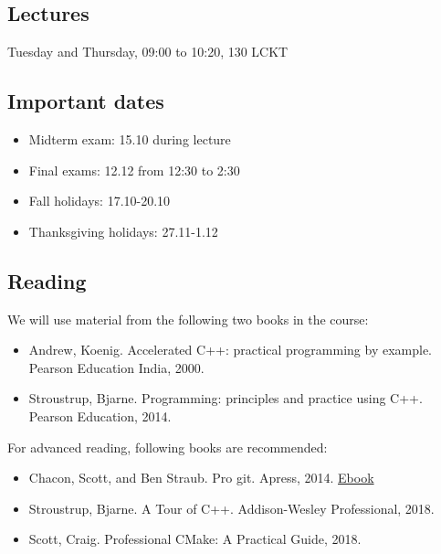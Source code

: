 \documentclass[11pt,letterpaper]{article}
\begin{document}
\subsection*{Lectures}
Tuesday and Thursday, 09:00 to 10:20, 130 LCKT 
\subsection*{Important dates}
\begin{itemize}
\item Midterm exam: 15.10 during lecture
\item Final exams: 12.12 from 12:30 to 2:30
\item Fall holidays: 17.10-20.10
\item Thanksgiving holidays: 27.11-1.12
\end{itemize}
\subsection*{Reading}

We will use material from the following two books in the course:

\begin{itemize}
\item Andrew, Koenig. Accelerated C++: practical programming by example. Pearson Education India, 2000.
\item Stroustrup, Bjarne. Programming: principles and practice using C++. Pearson Education, 2014.
\end{itemize}

For advanced reading, following books are recommended:

\begin{itemize}
\item Chacon, Scott, and Ben Straub. Pro git. Apress, 2014. \href{https://github.com/progit/progit2/releases/download/2.1.146/progit.pdf}{Ebook}
\item Stroustrup, Bjarne. A Tour of C++. Addison-Wesley Professional, 2018.
\item Scott, Craig. Professional CMake: A Practical Guide, 2018.
\end{itemize}
\end{document}
